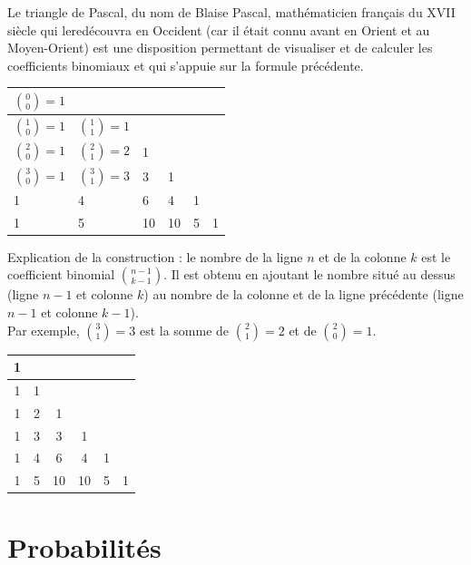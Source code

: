 \documentclass[french]{book}
\begin{document}
\begin{prop}
 Le triangle de Pascal, du nom de Blaise Pascal, mathématicien français du XVII siècle qui le\og{}redécouvra\fg{} en Occident (car il était connu avant en Orient et au Moyen-Orient) est une disposition permettant de visualiser et de calculer les coefficients binomiaux et qui s'appuie sur la formule précédente.
\begin{center}
 \begin{tabular}{|p{1.5cm}|p{1.5cm}|p{1.5cm}|p{1.5cm}|p{1.5cm}|p{1.5cm}|}
\hline
  $\binom{0}{0}=1$ & & & & &\\
\hline
$\binom{1}{0}=1$ & $\binom{1}{1}=1$ & & & &\\
\hline
$\binom{2}{0}=1$ & $\binom{2}{1}=2$ & 1 & & &\\
\hline
$\binom{3}{0}=1$ & $\binom{3}{1}=3$ & 3 & 1 & & \\
\hline
1 & 4 & 6 & 4 & 1 &\\
\hline
1 & 5 & 10 & 10 & 5 & 1\\
\hline
 \end{tabular}
 
\end{center} 

Explication de la construction : le nombre de la ligne $n$ et de la colonne $k$ est le coefficient binomial $\binom{n-1}{k-1}$. Il est obtenu en ajoutant le nombre situé au dessus (ligne $n-1$ et colonne $k$) au nombre de la colonne et de la ligne précédente (ligne $n-1$ et colonne $k-1$).\\
Par exemple, $\binom{3}{1}=3$ est la somme de $\binom{2}{1}=2$ et de $\binom{2}{0}=1$.
\begin{center}
 \begin{tabular}{|c|c|c|c|c|c|}
\hline
  1 & & & & &\\
\hline
1 & 1 & & & &\\
\hline
1 & 2 & 1 & & &\\
\hline
1 & 3 & 3 & 1 & & \\
\hline
1 & 4 & 6 & 4 & 1 &\\
\hline
1 & 5 & 10 & 10 & 5 & 1\\
\hline
 \end{tabular}
\end{center}
\end{prop}



\chapter{Probabilit\'es}
\end{document}

